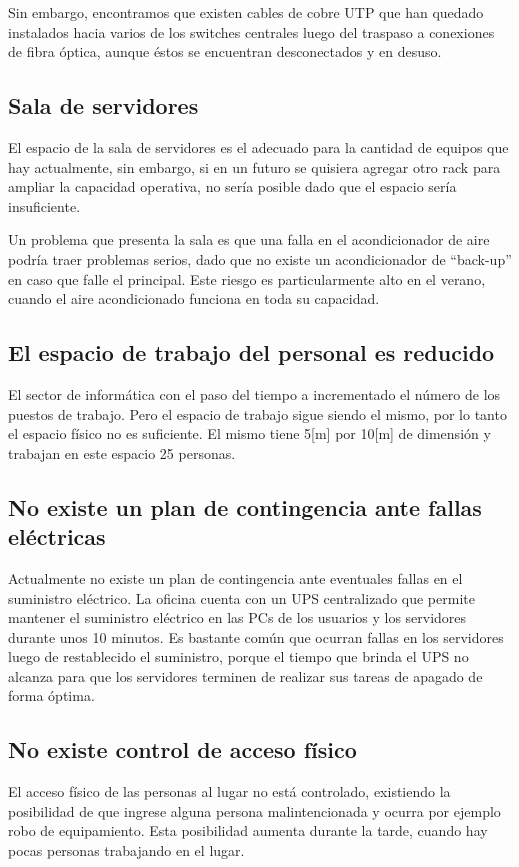 \documentclass[a4paper,11pt,oneside]{article}
\begin{document}
Sin embargo, encontramos que existen cables de cobre UTP que han
quedado instalados hacia varios de los switches centrales luego del
traspaso a conexiones de fibra óptica, aunque éstos se encuentran
desconectados y en desuso.
%
\subsection{Sala de servidores}
El espacio de la sala de servidores es el adecuado para la cantidad de
equipos que hay actualmente, sin embargo, si en un futuro se quisiera
agregar otro rack para ampliar la capacidad operativa, no sería
posible dado que el espacio sería insuficiente.

Un problema que presenta la sala es que una falla en el acondicionador
de aire podría traer problemas serios, dado que no existe un
acondicionador de ``back-up'' en caso que falle el principal. Este
riesgo es particularmente alto en el verano, cuando el aire
acondicionado funciona en toda su capacidad.
%
\subsection{El espacio de trabajo del personal es reducido}
El sector de informática con el paso del tiempo a incrementado el
número de los puestos de trabajo. Pero el espacio de trabajo sigue
siendo el mismo, por lo tanto el espacio físico no es suficiente. El
mismo tiene 5[m] por 10[m] de dimensión y trabajan en este espacio 25
personas.
%
\subsection{No existe un plan de contingencia ante fallas eléctricas}
Actualmente no existe un plan de contingencia ante eventuales fallas
en el suministro eléctrico. La oficina cuenta con un UPS centralizado
que permite mantener el suministro eléctrico en las PCs de los
usuarios y los servidores durante unos 10 minutos. Es bastante común
que ocurran fallas en los servidores luego de restablecido el
suministro, porque el tiempo que brinda el UPS no alcanza para que los
servidores terminen de realizar sus tareas de apagado de forma óptima.
%
\subsection{No existe control de acceso físico}
El acceso físico de las personas al lugar no está controlado,
existiendo la posibilidad de que ingrese alguna persona
malintencionada y ocurra por ejemplo robo de equipamiento. Esta
posibilidad aumenta durante la tarde, cuando hay pocas personas
trabajando en el lugar.
\end{document}
